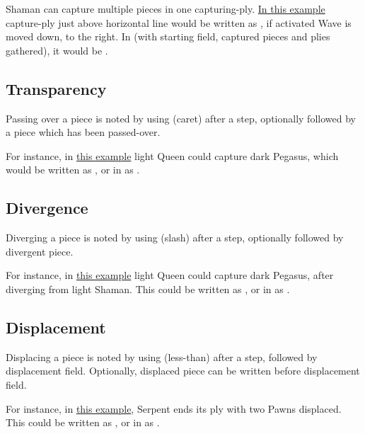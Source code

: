 Shaman can capture multiple pieces in one capturing-ply.
\hyperref[fig:scn_cot_004_light_shaman_capture_ply]{In this example} capture-ply just above
horizontal line would be written as , if activated Wave is moved
down, to the right. In  (with starting field, captured pieces and plies gathered),
it would be \alg{[Hd9.h10*P.l11*P.p12]\~{}[Wp12-n8]}.

\subsection*{Transparency}
\label{sec:Appendix/Notation/Transparency}

Passing over a piece is noted by using \alg{\^{}} (caret) after a step,
optionally followed by a piece which has been passed-over.

For instance, in \hyperref[fig:scn_mv_07_wave_is_transparent]{this example} light Queen
could capture dark Pegasus, which would be written as \newline
{}, or in  as \newline
{}.

\subsection*{Divergence}
\label{sec:Appendix/Notation/Divergence}

Diverging a piece is noted by using \alg{/} (slash) after a step, optionally followed
by divergent piece.

For instance, in \hyperref[fig:scn_cot_030_own_shaman_is_divergent_init]{this example}
light Queen could capture dark Pegasus, after diverging from light Shaman.
This could be written as , or in  as .

\subsection*{Displacement}
\label{sec:Appendix/Notation/Displacement}

Displacing a piece is noted by using \alg{<} (less-than) after a step, followed by
displacement field. Optionally, displaced piece can be written before displacement
field.

For instance, in \hyperref[fig:scn_tr_19_displacement_init]{this example}, Serpent ends
its ply with two Pawns displaced. This could be written as ,
or in  as \newline
{}.

